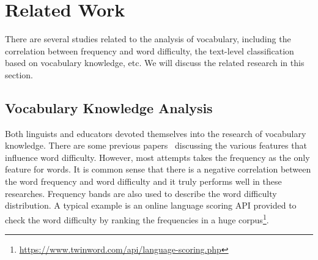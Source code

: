 \section{Related Work}
\label{sec:related}

There are several studies related to the analysis of vocabulary, including the correlation between frequency and word difficulty, the text-level classification based on vocabulary knowledge,  etc.
We will discuss the related research in this section.

\subsection{Vocabulary Knowledge Analysis}

Both linguists and educators devoted themselves into the research of vocabulary knowledge. 
There are some previous papers~\cite{koirala2015word, breland1996word, kirkpatrick1949vocabulary} discussing the various features that influence word difficulty. However, most attempts takes the frequency as the only feature for words. It is common sense that there is a negative correlation between the word frequency and word difficulty and it truly performs well in these researches.
Frequency bands are also used to describe the word difficulty distribution.
A typical example is an online language scoring API provided to check the word difficulty by ranking the frequencies in a huge corpus\footnote{\url{https://www.twinword.com/api/language-scoring.php}}. 

